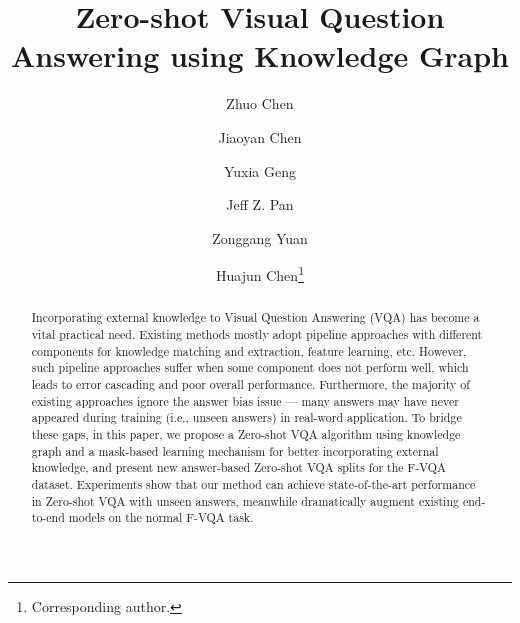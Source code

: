 \documentclass[runningheads]{llncs}
\newcommand{\cjy}[1]{{\color{black}#1}}
\newcommand{\jeff}[1]{{\color{black}#1}}
\begin{document}
\title{Zero-shot Visual Question Answering using Knowledge Graph}
\author{
Zhuo Chen
\and
Jiaoyan Chen
\and
Yuxia Geng
\and
Jeff Z. Pan
\and
Zonggang Yuan
\and
Huajun Chen\thanks{Corresponding author.} 
}


\maketitle             


\begin{abstract}
\jeff{Incorporating} external knowledge to Visual Question Answering (VQA) has become a vital practical need. 
Existing \cjy{methods mostly adopt pipeline approaches with different components for knowledge matching and extraction, feature learning, etc.
However, such pipeline approaches suffer when some component does not perform well, which leads to error cascading and poor overall performance. 
}
Furthermore, \cjy{the majority of existing approaches ignore the answer bias issue --- many answers may have never appeared  during training (i.e., unseen answers) in real-word application. To bridge these gaps, in this paper, we propose a Zero-shot VQA algorithm using knowledge graph and a mask-based learning mechanism for better incorporating external knowledge, and present new answer-based Zero-shot VQA splits for the F-VQA dataset. 
\cjy{Experiments} show that our method can achieve state-of-the-art performance in Zero-shot VQA with unseen answers, meanwhile dramatically augment existing end-to-end models on \cjy{the normal F-VQA task}.}

\end{abstract}
\end{document}
